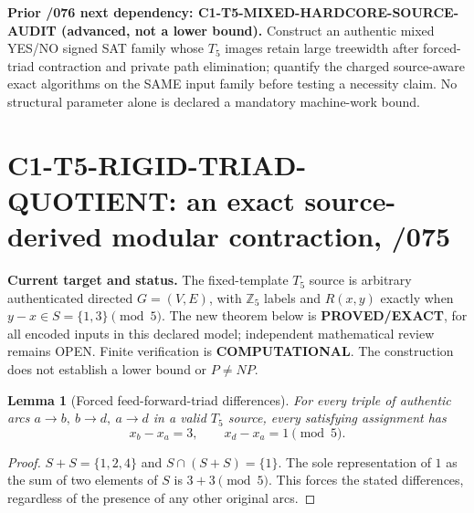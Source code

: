 \documentclass[11pt]{article}
\newtheorem{lemma}{Lemma}
\begin{document}
\noindent\textbf{Prior /076 next dependency:
C1-T5-MIXED-HARDCORE-SOURCE-AUDIT (advanced, not a lower bound).}
Construct an authentic mixed YES/NO signed SAT family whose
$T_5$ images retain large treewidth after forced-triad contraction
and private path elimination; quantify the charged
source-aware exact algorithms on the SAME input family before
testing a necessity claim. No structural parameter alone is
declared a mandatory machine-work bound.

\section{C1-T5-RIGID-TRIAD-QUOTIENT: an exact source-derived modular contraction, /075}
\noindent\textbf{Current target and status.}
The fixed-template $T_5$ source is arbitrary authenticated directed
$G=(V,E)$, with $\mathbb Z_5$ labels and
$R(x,y)$ exactly when $y-x\in S=\{1,3\}\pmod5$.
The new theorem below is \textbf{PROVED/EXACT}, for all encoded inputs
in this declared model; independent mathematical review remains OPEN.
Finite verification is \textbf{COMPUTATIONAL}. The construction does
not establish a lower bound or $P\ne NP$.

\begin{lemma}[Forced feed-forward-triad differences]
For every triple of authentic arcs
$a\to b,\ b\to d,\ a\to d$ in a valid $T_5$ source, every
satisfying assignment has
\[
 x_b-x_a=3,\qquad x_d-x_a=1\pmod5.
\]
\end{lemma}
\begin{proof}
$S+S=\{1,2,4\}$ and $S\cap(S+S)=\{1\}$.
The sole representation of $1$ as the sum of two elements of
$S$ is $3+3\pmod5$. This forces the stated differences,
regardless of the presence of any other original arcs.
\end{proof}
\end{document}
